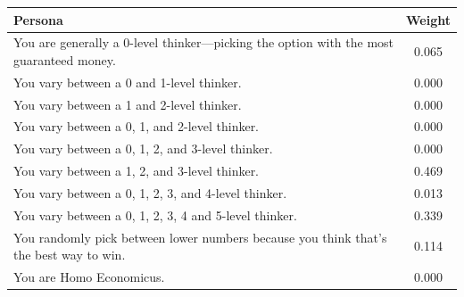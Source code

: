 \begin{tabular}{p{}c}
  \hline
 \textbf{Persona} & \textbf{Weight} \\
\hline
 
  
You are generally a 0-level thinker---picking the option with the most guaranteed money. & 0.065 \\ 
  You vary between a 0 and 1-level thinker. & 0.000 \\ 
  You vary between a 1 and 2-level thinker. & 0.000 \\ 
  You vary between a 0, 1, and 2-level thinker. & 0.000 \\ 
  You vary between a 0, 1, 2, and 3-level thinker. & 0.000 \\ 
  You vary between a 1, 2, and 3-level thinker. & 0.469 \\ 
  You vary between a 0, 1, 2, 3, and 4-level thinker. & 0.013 \\ 
  You vary between a 0, 1, 2, 3, 4 and 5-level thinker. & 0.339 \\ 
  You randomly pick between lower numbers because you think that's the best way to win. & 0.114 \\ 
  You are Homo Economicus. & 0.000 \\ 
   \hline 
\end{tabular}
